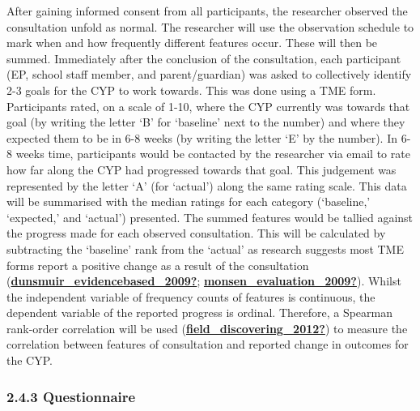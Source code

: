 \documentclass[
]{article}
\begin{document}
After gaining informed consent from all participants, the researcher
observed the consultation unfold as normal. The researcher will use the
observation schedule to mark when and how frequently different features
occur. These will then be summed. Immediately after the conclusion of
the consultation, each participant (EP, school staff member, and
parent/guardian) was asked to collectively identify 2-3 goals for the
CYP to work towards. This was done using a TME form. Participants rated,
on a scale of 1-10, where the CYP currently was towards that goal (by
writing the letter `B' for `baseline' next to the number) and where they
expected them to be in 6-8 weeks (by writing the letter `E' by the
number). In 6-8 weeks time, participants would be contacted by the
researcher via email to rate how far along the CYP had progressed
towards that goal. This judgement was represented by the letter `A' (for
`actual') along the same rating scale. This data will be summarised with
the median ratings for each category (`baseline,' `expected,' and
`actual') presented. The summed features would be tallied against the
progress made for each observed consultation. This will be calculated by
subtracting the `baseline' rank from the `actual' as research suggests
most TME forms report a positive change as a result of the consultation
(\protect\hyperlink{ref-dunsmuir_evidencebased_2009}{\textbf{dunsmuir\_evidencebased\_2009?}};
\protect\hyperlink{ref-monsen_evaluation_2009}{\textbf{monsen\_evaluation\_2009?}}).
Whilst the independent variable of frequency counts of features is
continuous, the dependent variable of the reported progress is ordinal.
Therefore, a Spearman rank-order correlation will be used
(\protect\hyperlink{ref-field_discovering_2012}{\textbf{field\_discovering\_2012?}})
to measure the correlation between features of consultation and reported
change in outcomes for the CYP.

\hypertarget{questionnaire-1}{%
\subsubsection{2.4.3 Questionnaire}\label{questionnaire-1}}
\end{document}
